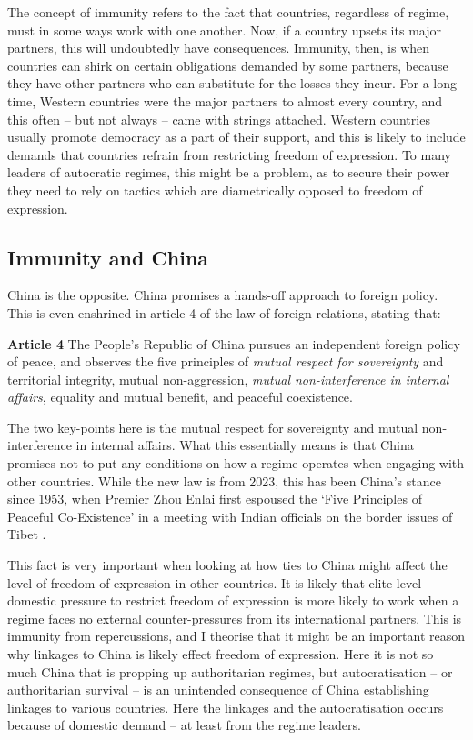 The concept of immunity refers to the fact that countries, regardless of regime, must in some ways work with one another. Now, if a country upsets its major partners, this will undoubtedly have consequences. Immunity, then, is when countries can shirk on certain obligations demanded by some partners, because they have other partners who can substitute for the losses they incur. For a long time, Western countries were the major partners to almost every country, and this often -- but not always \citep{borzel_noble_2015, wong_chinese_2019} -- came with strings attached. Western countries usually promote democracy as a part of their support, and this is likely to include demands that countries refrain from restricting freedom of expression. To many leaders of autocratic regimes, this might be a problem, as to secure their power they need to rely on tactics which are diametrically opposed to freedom of expression.

\subsection{Immunity and China}
China is the opposite. China promises a hands-off approach to foreign policy. This is even enshrined in article 4 of the law of foreign relations, stating that:
\begin{displayquote}
\textbf{Article 4} The People's Republic of China pursues an independent foreign policy of peace, and observes the five principles of \textit{mutual respect for sovereignty} and territorial integrity, mutual non-aggression, \textit{mutual non-interference in internal affairs}, equality and mutual benefit, and peaceful coexistence. \citep[emphases are my own]{xinhua_law_2023}
\end{displayquote}
The two key-points here is the mutual respect for sovereignty and mutual non-interference in internal affairs. What this essentially means is that China promises not to put any conditions on how a regime operates when engaging with other countries. While the new law is from 2023, this has been China's stance since 1953, when Premier Zhou Enlai first espoused the `Five Principles of Peaceful Co-Existence' in a meeting with Indian officials on the border issues of Tibet \citep{zhonghua_renmin_gongheguo_jiaowenbu_ministry_of_foreign_affairs_of_the_peoples_republic_of_china_zhongguo_2000}.

This fact is very important when looking at how ties to China might affect the level of freedom of expression in other countries. It is likely that elite-level domestic pressure to restrict freedom of expression is more likely to work when a regime faces no external counter-pressures from its international partners. This is immunity from repercussions, and I theorise that it might be an important reason why linkages to China is likely effect freedom of expression. Here it is not so much China that is propping up authoritarian regimes, but autocratisation -- or authoritarian survival -- is an unintended consequence of China establishing linkages to various countries. Here the linkages and the autocratisation occurs because of domestic demand -- at least from the regime leaders.

